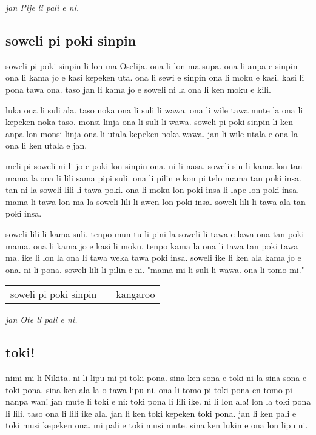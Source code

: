 \textit{jan Pije li pali e ni. \cite{www:Pije:01}}
%
\subsection{soweli pi poki sinpin}

soweli pi poki sinpin li lon ma Oselija.
ona li lon ma supa.
ona li anpa e sinpin ona li kama jo e kasi kepeken uta.
ona li sewi e sinpin ona li moku e kasi.
kasi li pona tawa ona.
taso jan li kama jo e soweli ni la ona li ken moku e kili.

luka ona li suli ala.
taso noka ona li suli li wawa.
ona li wile tawa mute la ona li kepeken noka taso.
monsi linja ona li suli li wawa.
soweli pi poki sinpin li ken anpa lon monsi linja ona li utala kepeken noka wawa.
jan li wile utala e ona la ona li ken utala e jan.

meli pi soweli ni li jo e poki lon sinpin ona.
ni li nasa.
soweli sin li kama lon tan mama la ona li lili sama pipi suli.
ona li pilin e kon pi telo mama tan poki insa.
tan ni la soweli lili li tawa poki.
ona li moku lon poki insa li lape lon poki insa.
mama li tawa lon ma la soweli lili li awen lon poki insa.
soweli lili li tawa ala tan poki insa.

soweli lili li kama suli.
tenpo mun tu li pini la soweli li tawa e lawa ona tan poki mama.
ona li kama jo e kasi li moku.
tenpo kama la ona li tawa tan poki tawa ma.
ike li lon la ona li tawa weka tawa poki insa.
soweli ike li ken ala kama jo e ona.
ni li pona.
soweli lili li pilin e ni.
"mama mi li suli li wawa.
ona li tomo mi."

\begin{supertabular}{p{5,5cm}|ll}
soweli pi poki sinpin && kangaroo \\ 
\end{supertabular}

\textit{jan Ote li pali e ni. \cite{www:sowelitoki:01}}
%
%
\subsection{toki!}

nimi mi li Nikita. ni li lipu mi pi toki pona. sina ken sona e toki ni la sina sona e toki pona. sina ken ala la o tawa lipu ni. ona li tomo pi toki pona en tomo pi nanpa wan! 
jan mute li toki e ni: toki pona li lili ike. ni li lon ala! lon la toki pona li lili. taso ona li lili ike ala. jan li ken toki kepeken toki pona. jan li ken pali e toki musi kepeken ona. 
mi pali e toki musi mute. sina ken lukin e ona lon lipu ni.

